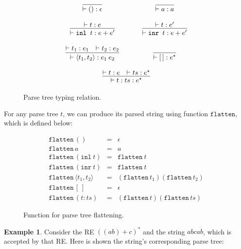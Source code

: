 \documentclass[review]{elsarticle}
\newcommand{\flatten}{\ensuremath{\texttt{flatten}}}
\newcommand{\inl}{\ensuremath{\texttt{inl}}}
\newcommand{\inr}{\ensuremath{\texttt{inr}}}
\theoremstyle{definition}
\newtheorem{Example}{Example}
\begin{document}
\begin{figure}[h]
   \[ 
       \begin{array}{ccc}
         \infer{\vdash () : \epsilon}{} & \hspace{.5cm} & \infer{\vdash a : a}{}\\
         \\
         \infer{\vdash \texttt{inl }t : e + e'}{\vdash t : e}  & & 
         \infer{\vdash \texttt{inr }t : e + e'}{\vdash t : e'} \\ 
         \\
         \infer{\vdash \langle t_1, t_2 \rangle : e_1\:e_2}
               {\vdash t_1 : e_1 & \vdash t_2 : e_2}   & & 
         \infer{\vdash [\,] : e^\star}{} \\ \\
         \multicolumn{3}{c}{
           \infer{\vdash t : ts : e ^\star}
                 {\vdash t : e & \vdash ts : e ^\star}
         }
       \end{array}
   \]
   \caption{Parse tree typing relation.}
   \label{figure:parsetreetyping}
\end{figure}


For any parse tree $t$, we can produce its parsed string using function 
\flatten, which is defined below:
\begin{figure}[h]
\[
\begin{array}{lcl}
   \flatten\,() & = & \epsilon\\
   \flatten\,a  & = & a \\
   \flatten\,(\inl\:t) & = & \flatten\:t\\
   \flatten\,(\inr\:t) & = & \flatten\:t\\
   \flatten\,\langle t_1, t_2 \rangle & = & (\flatten\,t_1)(\flatten\,t_2)\\
   \flatten\,[\,] & = & \epsilon\\
   \flatten\,(t:ts) & = & (\flatten\,t)(\flatten\,ts)
\end{array}
\]
\caption{Function for parse tree flattening.}
\label{figure:flatten}
\end{figure}

\begin{Example}
\label{example:parsetree}
Consider the RE $((ab)+c)^*$ and the string $abcab$, which is accepted by that RE. 
Here is shown the string's corresponding parse tree:

\begin{center}
\end{center}

\end{Example}
\end{document}
